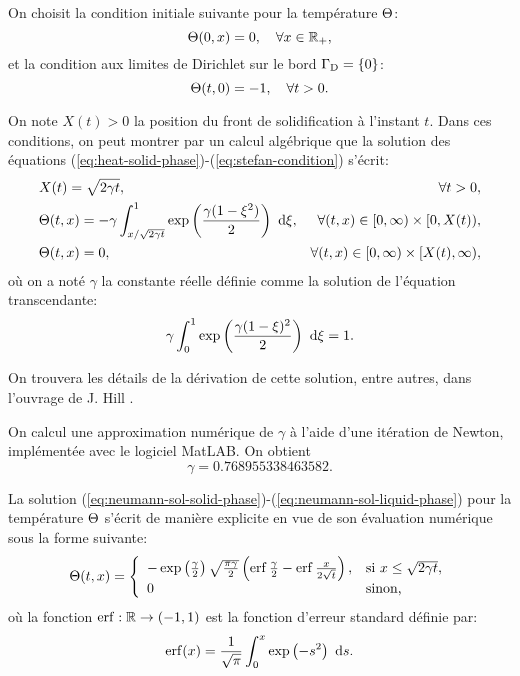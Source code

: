 On choisit la condition initiale suivante pour la température
$\Theta$:
\begin{equation}
  \Theta(0, x) = 0, \quad \forall x\in\mathbb R_+,
\end{equation}
et la condition aux limites de Dirichlet sur le bord $\Gamma_\mathrm{D} =
\left\{ 0 \right\}$:
\begin{equation}
  \Theta(t, 0) = -1, \quad \forall t > 0.
\end{equation}

On note $X(t) > 0$ la position du front de solidification à l'instant
$t$. Dans ces conditions, on peut montrer par un calcul algébrique que
la solution des équations
(\ref{eq:heat-solid-phase})-(\ref{eq:stefan-condition}) s'écrit:
\begin{align}
  & X(t) = \sqrt{2\gamma t},& \forall t > 0,\label{eq:neumann-sol-frontier}\\
  & \temperature(t, x) = -\gamma\int_{x / \sqrt{2\gamma
      t}}^1\exp\parent{\frac{\gamma(1 - \xi^2)}{2}}\, \intd{\xi},%
  & \forall (t, x) \in [0,\infty)\times[0,X(t)),\label{eq:neumann-sol-solid-phase}\\
    & \temperature(t, x) = 0,
    & \forall (t, x) \in [0,\infty)\times[X(t), \infty),\label{eq:neumann-sol-liquid-phase}
\end{align}
où on a noté $\gamma$ la constante réelle définie comme la solution de
l'équation transcendante:
\begin{equation}
  \gamma \int_0^1\exp\left( \frac{\gamma(1 - \xi)^2}{2} \right)\,\,\mathrm d\xi
  = 1.
\end{equation}

On trouvera les détails de la dérivation de cette solution, entre
autres, dans l'ouvrage de J. Hill \cite{HillStefanProblems}.

On calcul une approximation numérique de $\gamma$ à l'aide d'une
itération de Newton, implémentée avec le logiciel MatLAB. On obtient
\begin{equation}\label{eq:gamma}
  \gamma =\num{0.768955338463582}.
\end{equation}

La solution
(\ref{eq:neumann-sol-solid-phase})-(\ref{eq:neumann-sol-liquid-phase})
pour la température $\Theta$ s'écrit de manière explicite
en vue de son évaluation numérique sous la forme suivante:
\begin{equation}\label{eq:neumann-sol}
  \temperature(t, x) = \left\{
  \begin{array}{ll}
    -\exp\parent{\frac{\gamma}{2}}\sqrt{\frac{\pi\gamma}{2}} %
    \parent{\erf{\frac{\gamma}{2}} - \erf{\frac{x}{2\sqrt{t}}}}, %
    & \text{si } x \leq \sqrt{2\gamma t},\\
    0 %
    & \text{sinon,}
  \end{array}
  \right.
\end{equation}
où la fonction $\operatorname{erf}:\mathbb R\to(-1,1)$ est la fonction d'erreur
standard définie par:
\begin{equation}
  \operatorname{erf}(x) = \frac{1}{\sqrt \pi}\int_0^x \exp\left( -s^2 \right)\,\,\mathrm ds.
\end{equation}


